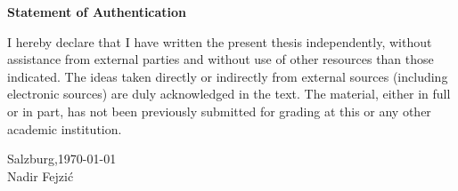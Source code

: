\documentclass[12pt]{article}
\begin{document}


\newpage

\printbibliography

\newpage

\vspace*{\fill}
\begin{center}
    \textbf{\Huge Statement of Authentication}\\
\end{center}

\vspace{1cm}

I hereby declare that I have written the present thesis independently, without
assistance from external parties and without use of other resources than those
indicated. The ideas taken directly or indirectly from external sources
(including electronic sources) are duly acknowledged in the text. The material,
either in full or in part, has not been previously submitted for grading at
this or any other academic institution.\\

\vspace{1cm}

Salzburg,\today \hspace{0.5cm}\hrulefill\\
\vspace{-0.5cm}
\flushright Nadir Fejzić

\vspace*{\fill}
\end{document}
